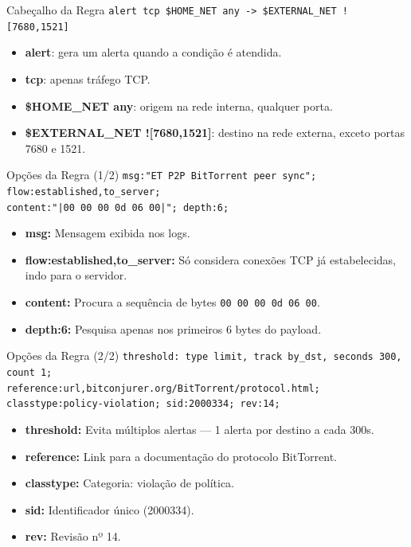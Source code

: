 \begin{frame}{Cabeçalho da Regra}
    \small
    \texttt{alert tcp \$HOME\_NET any -> \$EXTERNAL\_NET ![7680,1521]}

    \begin{itemize}
        \item \textbf{alert}: gera um alerta quando a condição é atendida.
        \item \textbf{tcp}: apenas tráfego TCP.
        \item \textbf{\$HOME\_NET any}: origem na rede interna, qualquer porta.
        \item \textbf{\$EXTERNAL\_NET ![7680,1521]}: destino na rede externa, exceto portas 7680 e 1521.
    \end{itemize}
\end{frame}

\begin{frame}{Opções da Regra (1/2)}
    \small
    \texttt{msg:"ET P2P BitTorrent peer sync"; \\
        flow:established,to\_server; \\
        content:"|00 00 00 0d 06 00|"; depth:6;}

    \begin{itemize}
        \item \textbf{msg:} Mensagem exibida nos logs.
        \item \textbf{flow:established,to\_server:} Só considera conexões TCP já estabelecidas, indo para o servidor.
        \item \textbf{content:} Procura a sequência de bytes \texttt{00 00 00 0d 06 00}.
        \item \textbf{depth:6:} Pesquisa apenas nos primeiros 6 bytes do payload.
    \end{itemize}
\end{frame}

\begin{frame}{Opções da Regra (2/2)}
    \small
    \texttt{threshold: type limit, track by\_dst, seconds 300, count 1; \\
        reference:url,bitconjurer.org/BitTorrent/protocol.html; \\
        classtype:policy-violation; sid:2000334; rev:14;}

    \begin{itemize}
        \item \textbf{threshold:} Evita múltiplos alertas — 1 alerta por destino a cada 300s.
        \item \textbf{reference:} Link para a documentação do protocolo BitTorrent.
        \item \textbf{classtype:} Categoria: violação de política.
        \item \textbf{sid:} Identificador único (2000334).
        \item \textbf{rev:} Revisão nº 14.
    \end{itemize}
\end{frame}